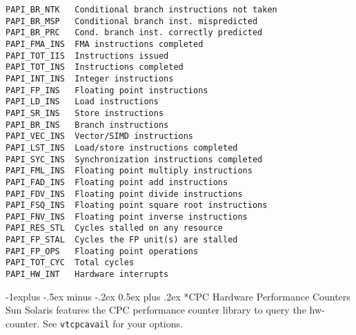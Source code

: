 \documentclass[letterpaper,10pt,landscape]{article}
\makeatletter
\renewcommand{\subsection}{\@startsection{subsection}{2}{0mm}%
                                {-1explus -.5ex minus -.2ex}%
                                {0.5ex plus .2ex}%
                                {\normalfont\normalsize\bfseries}}
\makeatother
\begin{document}
\begin{multicols}{3}
\begin{scriptsize}
\begin{verbatim}
PAPI_BR_NTK   Conditional branch instructions not taken           
PAPI_BR_MSP   Conditional branch inst. mispredicted        
PAPI_BR_PRC   Cond. branch inst. correctly predicted 
PAPI_FMA_INS  FMA instructions completed                          
PAPI_TOT_IIS  Instructions issued                                 
PAPI_TOT_INS  Instructions completed                              
PAPI_INT_INS  Integer instructions                                
PAPI_FP_INS   Floating point instructions                         
PAPI_LD_INS   Load instructions                                   
PAPI_SR_INS   Store instructions                                  
PAPI_BR_INS   Branch instructions                                 
PAPI_VEC_INS  Vector/SIMD instructions                            
PAPI_LST_INS  Load/store instructions completed                   
PAPI_SYC_INS  Synchronization instructions completed              
PAPI_FML_INS  Floating point multiply instructions                
PAPI_FAD_INS  Floating point add instructions                     
PAPI_FDV_INS  Floating point divide instructions                  
PAPI_FSQ_INS  Floating point square root instructions             
PAPI_FNV_INS  Floating point inverse instructions                 
PAPI_RES_STL  Cycles stalled on any resource    
PAPI_FP_STAL  Cycles the FP unit(s) are stalled 
PAPI_FP_OPS   Floating point operations         
PAPI_TOT_CYC  Total cycles                      
PAPI_HW_INT   Hardware interrupts               
\end{verbatim} 
\end{scriptsize}



\subsection*{CPC Hardware Performance Counters}
Sun Solaris features the CPC performance counter library to query the hw-counter. See \texttt{vtcpcavail} for your options.


\end{multicols}
\end{document}
